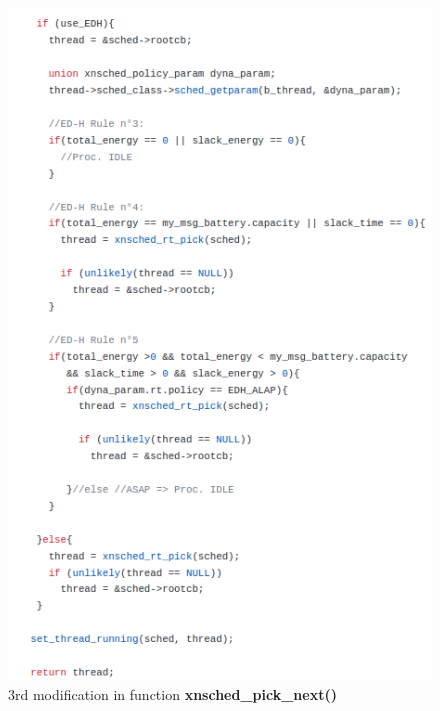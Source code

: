 \documentclass[12pt,hidelinks]{article}
\begin{document}
{\begin{itemize}
	    \begin{figure}[ht]
        \centering
        \begin{minipage}{0.45\textwidth}
            \centering
            \includegraphics[width=1.2\textwidth]{EDH_rules.png} %
            \caption{3rd modification in function \textbf{xnsched\_pick\_next()}}
        \end{minipage}\hfill
        \begin{minipage}{0.45\textwidth}
            \centering

\end{minipage}
\end{figure}
\end{itemize}}
\end{document}
